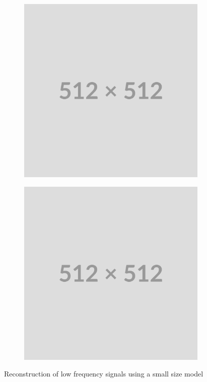 {\begin{figure}
    \centering
    \begin{subfigure}[b]{0.3\textwidth}
        \centering
        \includegraphics[width=\textwidth]{img/placeholder512.png}
    \end{subfigure}
    \begin{subfigure}[b]{0.3\textwidth}
        \centering
        \includegraphics[width=\textwidth]{img/placeholder512.png}
    \end{subfigure}
    \caption{Reconstruction of low frequency signals using a small size model}
    \label{f:mr-module}
\end{figure}

}
